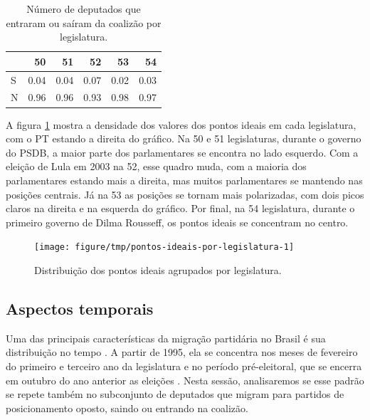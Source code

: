 \documentclass[a4paper,titlepage]{ppgi}\usepackage[]{graphicx}\usepackage[]{color}
\newenvironment{knitrout}{}{} %
\begin{document}
\begin{table}
\centering
\begin{knitrout}
\color{fgcolor}
\begin{tabular}{l|r|r|r|r|r}
\hline
  & 50 & 51 & 52 & 53 & 54\\
\hline
S & 0.04 & 0.04 & 0.07 & 0.02 & 0.03\\
\hline
N & 0.96 & 0.96 & 0.93 & 0.98 & 0.97\\
\hline
\end{tabular}


\end{knitrout}
\caption{Número de deputados que entraram ou saíram da coalizão por legislatura.}
\label{table:coalition-changes-per-legislature}
\end{table}

A figura \ref{fig:pontos-ideais-por-legislatura} mostra a densidade dos valores
dos pontos ideais em cada legislatura, com o PT estando a direita do gráfico.
Na 50\textordfeminine{} e 51\textordfeminine{} legislaturas, durante o governo
do PSDB, a maior parte dos parlamentares se encontra no lado esquerdo. Com a
eleição de Lula em 2003 na 52\textordfeminine{}, esse quadro muda, com a
maioria dos parlamentares estando mais a direita, mas muitos parlamentares
se mantendo nas posições centrais. Já na 53\textordfeminine{} as posições se
tornam mais polarizadas, com dois picos claros na direita e na esquerda do
gráfico. Por final, na 54\textordfeminine{} legislatura, durante o primeiro
governo de Dilma Rousseff, os pontos ideais se concentram no centro.

\begin{knitrout}
\color{fgcolor}\begin{figure}
\texttt{[image: figure/tmp/pontos-ideais-por-legislatura-1]} \caption[Distribuição dos pontos ideais agrupados por legislatura]{Distribuição dos pontos ideais agrupados por legislatura.}\label{fig:pontos-ideais-por-legislatura}
\end{figure}


\end{knitrout}

\subsection{Aspectos temporais}
\label{sec:miolo:aspectos-temporais}



Uma das principais características da migração partidária no Brasil é sua
distribuição no tempo \cite{Araujo2000,Melo2004,Freitas2008}. A partir de 1995,
ela se concentra nos meses de fevereiro do primeiro e terceiro ano da
legislatura e no período pré-eleitoral, que se encerra em outubro do ano
anterior as eleições \cite{Freitas2008,Lei9504/1997}. Nesta sessão,
analisaremos se esse padrão se repete também no subconjunto de deputados que
migram para partidos de posicionamento oposto, saindo ou entrando na coalizão.
\end{document}
